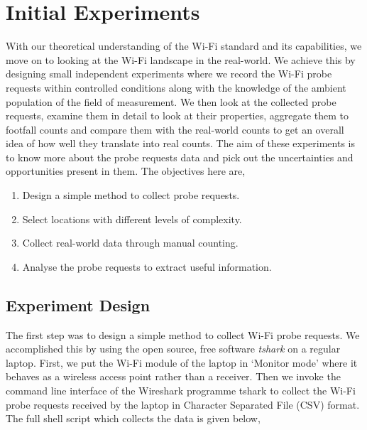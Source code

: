 \section{Initial Experiments}\label{section:intial:experiments}

With our theoretical understanding of the Wi-Fi standard and its capabilities, we move on to looking at the Wi-Fi landscape in the real-world.
We achieve this by designing small independent experiments where we record the Wi-Fi probe requests within controlled conditions along with the knowledge of the ambient population of the field of measurement. 
We then look at the collected probe requests, examine them in detail to look at their properties, aggregate them to footfall counts and compare them with the real-world counts to get an overall idea of how well they translate into real counts.
The aim of these experiments is to know more about the probe requests data and pick out the uncertainties and opportunities present in them.
The objectives here are,

\begin{enumerate}
  \setlength{\itemindent}{2em}
  \itemsep-0.25em
  \item Design a simple method to collect probe requests.
  \item Select locations with different levels of complexity.
  \item Collect real-world data through manual counting.
  \item Analyse the probe requests to extract useful information.
\end{enumerate}

\subsection{Experiment Design}

The first step was to design a simple method to collect Wi-Fi probe requests.
We accomplished this by using the open source, free software \textit{tshark} \cite{wireshark2} on a regular laptop.
First, we put the Wi-Fi module of the laptop in `Monitor mode' where it behaves as a wireless access point rather than a receiver.
Then we invoke the command line interface of the Wireshark programme tshark to collect the Wi-Fi probe requests received by the laptop in Character Separated File (CSV) format. 
The full shell script which collects the data is given below,

